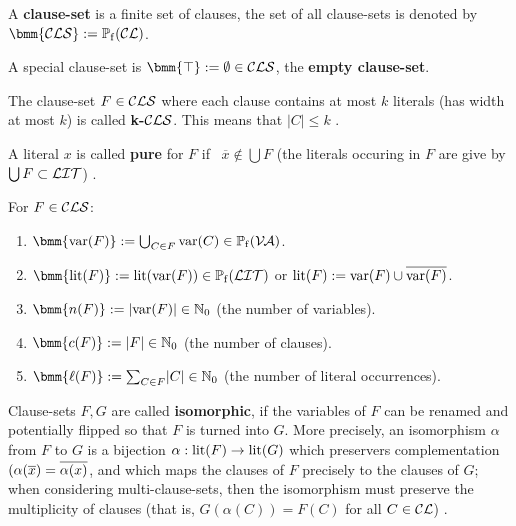 \documentclass[12pt]{book}
\begin{document}
\begin{defi}\label{def:cls}
      A \textbf{clause-set} is a finite set of clauses, the set of all clause-sets is denoted by $\bmm{\Cls} := \pote(\Cl)$.

      A special clause-set is $\bmm{\top} := \es \in \Cls$, the \textbf{empty clause-set}.
\end{defi}
\begin{defi}\label{def:cls2}
      The clause-set $F \in \mathcal{CLS}$ where each clause contains at most $k$ literals (has width at most $k$) is called \textbf{k-}$\mathcal{CLS}$.
      This means that $\mid C \mid \leq k$ \cite{h5}.
\end{defi}
\begin{defi}\label{def:cls3}
      A literal $x$ is called \textbf{pure} for $F$ if \ $\overline{x} \not \in \bigcup F$ 
      (the literals occuring in $F$ are give by $\bigcup F \subset \mathcal{LIT}$) \cite{h5}.
\end{defi}
\begin{defi}\label{def:cls4}
      For $F \in \mathcal{CLS}$:
      \begin{enumerate}
            \item $\bmm{\var(F)} := \bc_{C \in F} \var(C) \in \pote(\Va)$.
            \item $\bmm{\lit(F)} := \lit(\var(F)) \in \pote(\Lit)$ or $\operatorname{lit}(F) := \operatorname{var}(F) \cup \overline{\operatorname{var}(F)}$.
            \item $\bmm{n(F)} := \abs{\var(F)} \in \NNZ$ (the number of variables).
            \item $\bmm{c(F)} := \abs{F} \in \NNZ$ (the number of clauses).
            \item $\bmm{\ell(F)} := \sum_{C \in F} \abs{C} \in \NNZ$ (the number of literal occurrences).
      \end{enumerate}
\end{defi}
\begin{defi}\label{def:cls6}
      Clause-sets $F,G$ are called \textbf{isomorphic}, if the variables of $F$ can be renamed and potentially flipped so that $F$ is 
	  turned into $G$. More precisely, an isomorphism $\alpha$ from $F$ to $G$ is a bijection $\alpha : \operatorname{lit}(F) \rightarrow \operatorname{lit}(G)$ 
	  which preservers complementation $(\alpha(\overline x) = \overline {\alpha(x)}$, and which maps the clauses of $F$ precisely to the 
	  clauses of $G$; when considering multi-clause-sets, then the isomorphism must preserve the multiplicity of clauses (that is, 
	  $G(\alpha(C)) = F(C)$ for all $C \in \mathcal{CL}$) \cite{h9}.
\end{defi}
\end{document}
